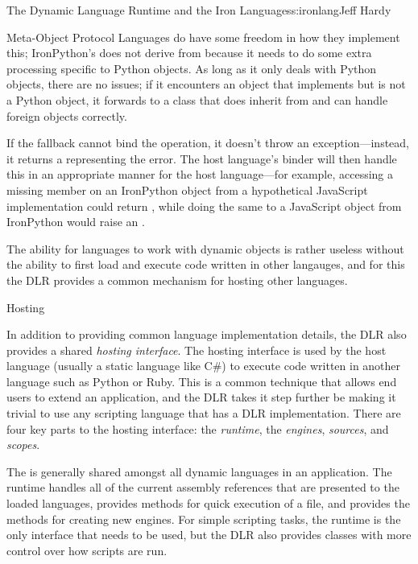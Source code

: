 \begin{aosachapter}{The Dynamic Language Runtime and the Iron Languages}{s:ironlang}{Jeff Hardy}
\begin{aosasect1}{Meta-Object Protocol}
Languages do have some freedom in how they implement this; IronPython's  does not derive from  because it needs to do some extra processing specific to Python objects. As long as it only deals with Python objects, there are no issues; if it encounters an object that implements  but is not a Python object, it forwards to a  class that does inherit from  and can handle foreign objects correctly.

If the fallback cannot bind the operation, it doesn't throw an exception---instead, it returns a  representing the error. The host language's binder will then handle this in an appropriate manner for the host language---for example, accessing a missing member on an IronPython object from a hypothetical JavaScript implementation could return , while doing the same to a JavaScript object from IronPython would raise an .

The ability for languages to work with dynamic objects is rather useless without the ability to first load and execute code written in other langauges, and for this the DLR provides a common mechanism for hosting other languages.

\end{aosasect1}

\begin{aosasect1}{Hosting}

In addition to providing common language implementation details, the DLR also provides a shared \emph{hosting interface}. The hosting interface is used by the host language (usually a static language like C\#) to execute code written in another language such as Python or Ruby. This is a common technique that allows end users to extend an application, and the DLR takes it step further be making it trivial to use any scripting language that has a DLR implementation. There are four key parts to the hosting interface: the \emph{runtime}, the \emph{engines}, \emph{sources},  and \emph{scopes}.

The  is generally shared amongst all dynamic languages in an application. The runtime handles all of the current assembly references that are presented to the loaded languages, provides methods for quick execution of a file, and provides the methods for creating new engines. For simple scripting tasks, the runtime is the only interface that needs to be used, but the DLR also provides classes with more control over how scripts are run.


\end{aosasect1}
\end{aosachapter}
